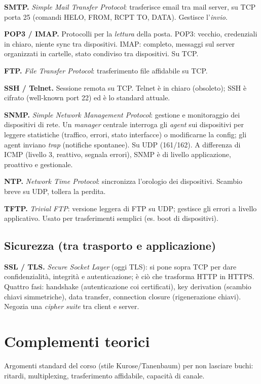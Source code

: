 \documentclass[11pt,a4paper]{report}
\begin{document}
\textbf{SMTP.} \emph{Simple Mail Transfer Protocol}: trasferisce email tra mail
server, su TCP porta 25 (comandi HELO, FROM, RCPT TO, DATA). Gestisce l'\emph{invio}.

\textbf{POP3 / IMAP.} Protocolli per la \emph{lettura} della posta. POP3: vecchio,
credenziali in chiaro, niente sync tra dispositivi. IMAP: completo, messaggi sul
server organizzati in cartelle, stato condiviso tra dispositivi. Su TCP.

\textbf{FTP.} \emph{File Transfer Protocol}: trasferimento file affidabile su TCP.

\textbf{SSH / Telnet.} Sessione remota su TCP. Telnet è in chiaro (obsoleto);
SSH è cifrato (well-known port 22) ed è lo standard attuale.

\textbf{SNMP.} \emph{Simple Network Management Protocol}: gestione e monitoraggio
dei dispositivi di rete. Un \emph{manager} centrale interroga gli \emph{agent}
sui dispositivi per leggere statistiche (traffico, errori, stato interfacce) o
modificarne la config; gli agent inviano \emph{trap} (notifiche spontanee).
Su UDP (161/162). A differenza di ICMP (livello 3, reattivo, segnala errori),
SNMP è di livello applicazione, proattivo e gestionale.

\textbf{NTP.} \emph{Network Time Protocol}: sincronizza l'orologio dei
dispositivi. Scambio breve su UDP, tollera la perdita.

\textbf{TFTP.} \emph{Trivial FTP}: versione leggera di FTP su UDP; gestisce gli
errori a livello applicativo. Usato per trasferimenti semplici (es. boot di
dispositivi).

\section*{Sicurezza (tra trasporto e applicazione)}

\textbf{SSL / TLS.} \emph{Secure Socket Layer} (oggi TLS): si pone sopra TCP per
dare confidenzialità, integrità e autenticazione; è ciò che trasforma HTTP in
HTTPS. Quattro fasi: handshake (autenticazione coi certificati), key derivation
(scambio chiavi simmetriche), data transfer, connection closure (rigenerazione
chiavi). Negozia una \emph{cipher suite} tra client e server.

\chapter{Complementi teorici}
Argomenti standard del corso (stile Kurose/Tanenbaum) per non lasciare buchi:
ritardi, multiplexing, trasferimento affidabile, capacità di canale.
\end{document}
